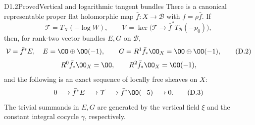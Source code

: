 \begin{claim}{D1.2}{Proved}{Vertical and logarithmic tangent bundles}
There is a canonical representable proper flat holomorphic map
$\bar f:X\to\mathcal B$ with $f=\rho\bar f$. If
\[
 \mathcal T=T_X(-\log W),\qquad
 \mathcal V=\ker\bigl(\mathcal T\to
                   \bar f^*T_{\mathcal B}(-p_0)\bigr),
\]
then, for rank-two vector bundles $E,G$ on $\mathcal B$,
\[
 \mathcal V=\bar f^*E,\quad E=\OO\oplus\OO(-1),\qquad
 G=R^1\bar f_*\OO_X=\OO\oplus\OO(-1),                 \tag{D.2}
\]
\[
 R^0\bar f_*\OO_X=\OO,\qquad R^2\bar f_*\OO_X=\OO(-1),
\]
and the following is an exact sequence of locally free sheaves on $X$:
\[
 0\longrightarrow\bar f^*E\longrightarrow\mathcal T
 \longrightarrow\bar f^*\OO(-5)\longrightarrow0.       \tag{D.3}
\]
The trivial summands in $E,G$ are generated by the vertical field $\xi$
and the constant integral cocycle $\gamma$, respectively.
\end{claim}
